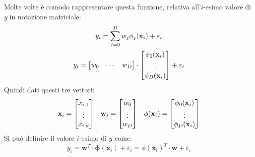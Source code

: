 \documentclass{article}
\numberwithin{equation}{subsection}
\newcommand{\vect}[1]{\boldsymbol{\mathbf{#1}}}
\begin{document}
Molte volte è comodo rappresentare questa funzione, relativa all'$i$-esimo valore di $y$ in notazione matriciale:
\begin{gather*}
    y_i=\displaystyle\sum_{j=0}^Dw_j\phi_j(\vect{x}_i)+\varepsilon_i\\
    y_i=\begin{bmatrix}
        w_0&\cdots&w_D
    \end{bmatrix}\cdot\begin{bmatrix}
        \strut\phi_0(\vect{x}_i)\\
        \vdots\\
        \strut\phi_D(\vect{x}_i)
    \end{bmatrix}+\varepsilon_i
\end{gather*}
Quindi dati questi tre vettori:
\begin{gather*}
    \begin{matrix}
        \vect{x}_i=\begin{bmatrix}
            \strut x_{i,1}\\\vdots\\\strut x_{i,d}
        \end{bmatrix}&
        \vect{w}_i=\begin{bmatrix}
            \strut w_{0}\\\vdots\\\strut w_{D}
        \end{bmatrix}&
        \phi(\vect{x}_i)=\begin{bmatrix}
            \strut\phi_{0}(\vect{x}_i)\\\vdots\\\strut\phi_{D}(\vect{x}_i)
        \end{bmatrix}            
    \end{matrix}
\end{gather*}
Si può definire il valore $i$-esimo di $y$ come:
\begin{equation*}
    y_i=\vect{w}^T\cdot\vect{\phi}(\vect{x}_i)+\varepsilon_i=\phi(\vect{x_i})^T\cdot\vect{w}+\varepsilon_i
\end{equation*}
\end{document}
